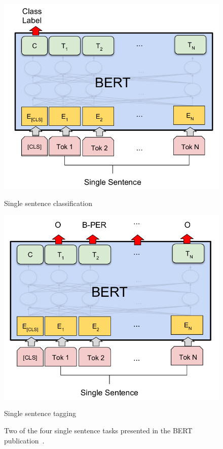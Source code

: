 \begin{figure}
    \centering
    \begin{minipage}{0.48\textwidth}
        \includegraphics[width=\textwidth]{figures/bert_single_sentence.png}
        \caption*{Single sentence classification}
    \end{minipage}
    \hspace*{3mm}
    \begin{minipage}{0.48\textwidth}
        \includegraphics[width=\textwidth]{figures/bert_ner.png}
        \caption*{Single sentence tagging}
    \end{minipage}
    \caption{Two of the four single sentence tasks presented in the BERT publication~\cite[Figure 3]{devlin2018}.}
    \label{fig:bert_classification}
\end{figure}

